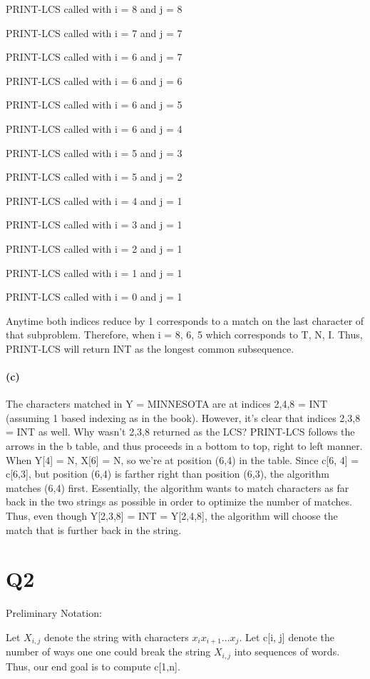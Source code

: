 \documentclass[11pt,a4paper]{article}
\begin{document}
	PRINT-LCS called with i = 8 and j = 8
	
	PRINT-LCS called with i = 7 and j = 7
	
	PRINT-LCS called with i = 6 and j = 7
	
	PRINT-LCS called with i = 6 and j = 6
	
	PRINT-LCS called with i = 6 and j = 5
	
	PRINT-LCS called with i = 6 and j = 4
	
	PRINT-LCS called with i = 5 and j = 3
	
	PRINT-LCS called with i = 5 and j = 2
	
	PRINT-LCS called with i = 4 and j = 1
	
	PRINT-LCS called with i = 3 and j = 1
	
	PRINT-LCS called with i = 2 and j = 1
	
	PRINT-LCS called with i = 1 and j = 1
	
	PRINT-LCS called with i = 0 and j = 1
	
	Anytime both indices reduce by 1 corresponds to a match on the last character of that subproblem. Therefore, when i = 8, 6, 5 which corresponds to T, N, I. Thus, PRINT-LCS will return INT as the longest common subsequence.
	
	\paragraph{(c)}
	The characters matched in Y = MINNESOTA are at indices 2,4,8 = INT (assuming 1 based indexing as in the book). However, it's clear that indices 2,3,8 = INT as well. Why wasn't 2,3,8 returned as the LCS? PRINT-LCS follows the arrows in the b table, and thus proceeds in a bottom to top, right to left manner. When Y[4] = N, X[6] = N, so we're at position (6,4) in the table. Since c[6, 4] = c[6,3], but position (6,4) is farther right than position (6,3), the algorithm matches (6,4) first. Essentially, the algorithm wants to match characters as far back in the two strings as possible in order to optimize the number of matches. Thus, even though Y[2,3,8] = INT = Y[2,4,8], the algorithm will choose the match that is further back in the string. 
	
\section*{Q2}
Preliminary Notation: 

Let $X_{i,j}$ denote the string with characters $x_{i}x_{i+1}...x_{j}$. Let c[i, j] denote the number of ways one one could break the string $X_{i,j}$ into sequences of words. Thus, our end goal is to compute c[1,n].
\end{document}
